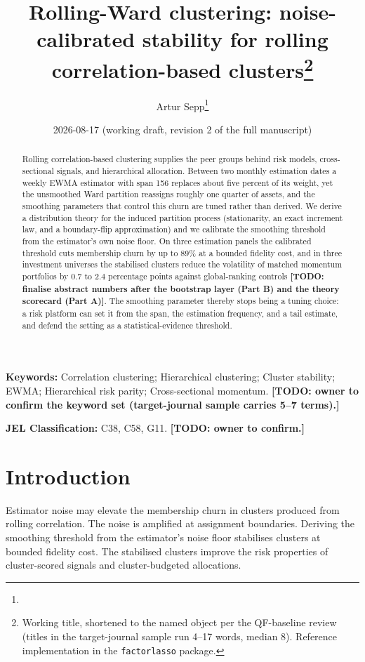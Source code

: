 \documentclass[11pt]{article}
\title{Rolling-Ward clustering: noise-calibrated stability for rolling
correlation-based clusters\thanks{Working title, shortened to the named
object per the QF-baseline review (titles in the target-journal sample run
4--17 words, median 8). \TODO{owner to confirm the title with the Gate 0
naming ruling.} Reference implementation in the \texttt{factorlasso}
package.}}
\author{Artur Sepp\thanks{\TODO{author list, affiliations, acknowledgements,
ORCIDs.}}}
\date{2026-08-17 (working draft, revision 2 of the full manuscript)}
\theoremstyle{remark}
\newcommand{\TODO}[1]{\textbf{[TODO: #1]}}
\begin{document}
\maketitle

\begin{abstract}
Rolling correlation-based clustering supplies the peer groups behind risk
models, cross-sectional signals, and hierarchical allocation. Between two
monthly estimation dates a weekly EWMA estimator with span 156 replaces about
five percent of its weight, yet the unsmoothed Ward partition reassigns roughly
one quarter of assets, and the smoothing parameters that control this churn are
tuned rather than derived. We derive a distribution theory for the induced
partition process (stationarity, an exact increment law, and a boundary-flip
approximation) and we calibrate the smoothing threshold from the estimator's
own noise floor. On three estimation panels the calibrated threshold cuts
membership churn by up to 89\% at a bounded fidelity cost, and in three
investment universes the stabilised clusters reduce the volatility of matched
momentum portfolios by 0.7 to 2.4 percentage points against global-ranking
controls \TODO{finalise abstract numbers after the bootstrap layer (Part B) and
the theory scorecard (Part A)}. The smoothing parameter thereby stops being a
tuning choice: a risk platform can set it from the span, the estimation
frequency, and a tail estimate, and defend the setting as a
statistical-evidence threshold.
\end{abstract}

\noindent\textbf{Keywords:} Correlation clustering; Hierarchical clustering;
Cluster stability; EWMA; Hierarchical risk parity; Cross-sectional momentum.
\TODO{owner to confirm the keyword set (target-journal sample carries 5--7
terms).}

\noindent\textbf{JEL Classification:} C38, C58, G11. \TODO{owner to confirm.}

\section{Introduction}

Estimator noise may elevate the membership churn in clusters produced from
rolling correlation. The noise is amplified at assignment boundaries. Deriving
the smoothing threshold from the estimator's noise floor stabilises clusters at
bounded fidelity cost. The stabilised clusters improve the risk properties of
cluster-scored signals and cluster-budgeted allocations.
\end{document}
